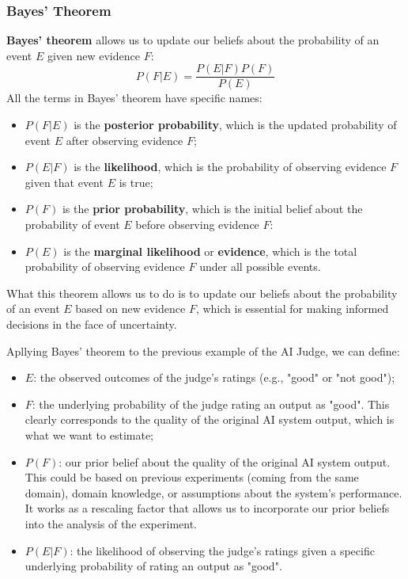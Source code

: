 \subsubsection{Bayes' Theorem}
\textbf{Bayes' theorem} allows us to update our beliefs about the probability of an event $E$ given new evidence $F$:
\begin{equation}
    P(F|E) = \frac{P(E|F) P(F)}{P(E)}
\end{equation}
All the terms in Bayes' theorem have specific names:
\begin{itemize}
    \item $P(F|E)$ is the \textbf{posterior probability}, which is the updated probability of event $E$ after observing evidence $F$;
    \item $P(E|F)$ is the \textbf{likelihood}, which is the probability of observing evidence $F$ given that event $E$ is true;
    \item $P(F)$ is the \textbf{prior probability}, which is the initial belief about the probability of event $E$ before observing evidence $F$:
    \item $P(E)$ is the \textbf{marginal likelihood} or \textbf{evidence}, which is the total probability of observing evidence $F$ under all possible events.
\end{itemize}
What this theorem allows us to do is to update our beliefs about the probability of an event $E$ based on new evidence $F$, 
which is essential for making informed decisions in the face of uncertainty.

Apllying Bayes' theorem to the previous example of the AI Judge, we can define:
\begin{itemize}
    \item $E$: the observed outcomes of the judge's ratings (e.g., "good" or "not good");
    \item $F$: the underlying probability of the judge rating an output as "good". This clearly corresponds
    to the quality of the original AI system output, which is what we want to estimate;
    \item $P(F)$: our prior belief about the quality of the original AI system output. 
    This could be based on previous experiments (coming from the same domain), domain knowledge, or assumptions about the system's performance.
    It works as a rescaling factor that allows us to incorporate our prior beliefs into the analysis of the experiment.
    \item $P(E|F)$: the likelihood of observing the judge's ratings given a specific underlying probability of rating an output as "good".
\end{itemize}

